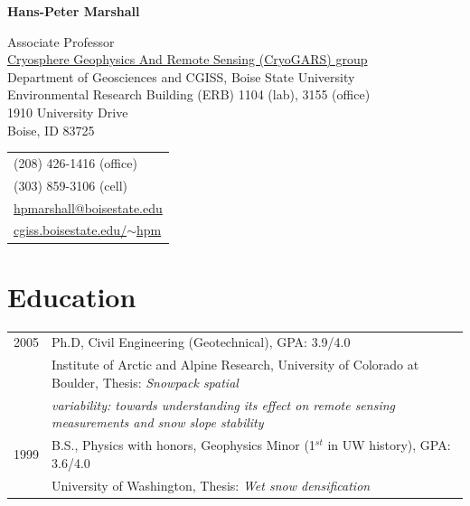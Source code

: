 \documentclass[11pt]{article}
\def\name{Hans-Peter Marshall}
\begin{document}

\centerline{\Large \bf \name}

\vspace{0.15in}

\begin{minipage}{0.70\linewidth}
Associate Professor \\
  \href{http://earth.boisestate.edu/cryogars/}{Cryosphere Geophysics And Remote Sensing (CryoGARS) group} \\
  Department of Geosciences and CGISS, Boise State University \\
  Environmental Research Building (ERB) 1104 (lab), 3155 (office) \\
  1910 University Drive \\
  Boise, ID  83725
\end{minipage}
\begin{minipage}{0.30\linewidth}
  \begin{tabular}{l}
     (208) 426-1416 (office) \\
     (303) 859-3106 (cell) \\
    \href{mailto:hpmarshall@boisestate.edu}{hpmarshall@boisestate.edu} \\
    \href{http://cgiss.boisestate.edu/~hpm}{cgiss.boisestate.edu/$\sim$hpm} \\
  \end{tabular}
\end{minipage}

\section*{Education}

\begin{tabular}{ll}
	2005 & Ph.D, Civil Engineering (Geotechnical), GPA: 3.9/4.0 \\
	          & Institute of Arctic and Alpine Research, University of Colorado at Boulder, Thesis: \textit{Snowpack spatial} \\
	          & \textit{variability: towards understanding its effect on remote sensing measurements and snow slope stability} \\
	1999 &  B.S., Physics with honors, Geophysics Minor (1$^{st}$ in UW history), GPA: 3.6/4.0 \\
	         &   University of Washington, Thesis: \textit{Wet snow densification} \\
\end{tabular}
\end{document}
